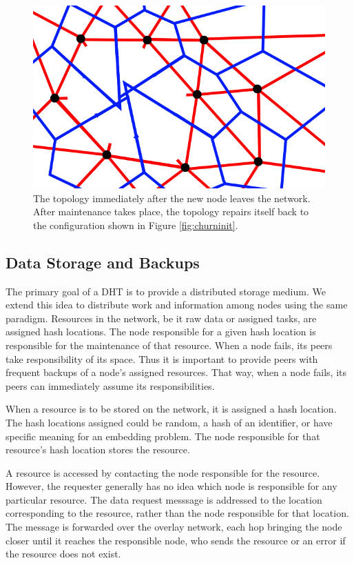 \documentclass[11pt]{IEEEtran} %
\begin{document}
\begin{figure}
    \includegraphics[width=\linewidth]{voronoi-churn1}
    \caption{The topology immediately after the new node leaves the network. After maintenance takes place, the topology repairs itself back to the configuration shown in Figure \ref{fig:churninit}.}
    \label{fig:churndrop}
\end{figure}


\subsection{Data Storage and Backups}
The primary goal of a DHT is to provide a distributed storage medium. We extend this idea to distribute work and information among nodes using the same paradigm. Resources in the network, be it raw data or assigned tasks, are assigned hash locations. The node responsible for a given hash location is responsible for the maintenance of that resource. When a node fails, its peers take responsibility of its space. Thus it is important to provide peers with frequent backups of a node's assigned resources.  That way, when a node fails, its peers can immediately assume its responsibilities.

When a resource is to be stored on the network, it is assigned a hash location. The hash locations assigned could be random, a hash of an identifier, or have specific meaning for an embedding problem. The node responsible for that resource's hash location stores the resource.

A resource is accessed by contacting the node responsible for the resource.  However, the requester generally has no idea which node is responsible for any particular resource.  The data request messsage is addressed to the location corresponding to the resource, rather than the node responsible for that location.  The message is forwarded over the overlay network, each hop bringing the node closer until it reaches the responsible node, who sends the resource or an error if the resource does not exist.
\end{document}
